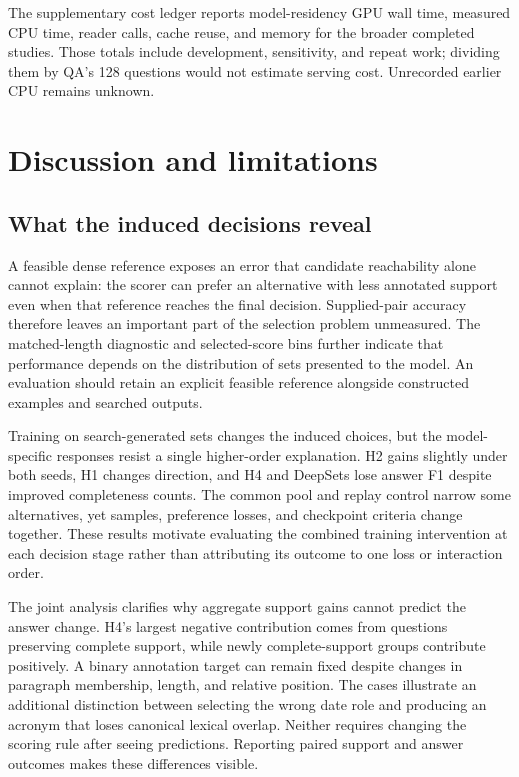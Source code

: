 \documentclass[preprint,12pt]{elsarticle}
\begin{document}


The supplementary cost ledger reports model-residency GPU wall time, measured CPU time, reader calls, cache reuse, and memory for the broader completed studies. Those totals include development, sensitivity, and repeat work; dividing them by QA's 128 questions would not estimate serving cost. Unrecorded earlier CPU remains unknown.

\section{Discussion and limitations}
\subsection{What the induced decisions reveal}
A feasible dense reference exposes an error that candidate reachability alone cannot explain: the scorer can prefer an alternative with less annotated support even when that reference reaches the final decision. Supplied-pair accuracy therefore leaves an important part of the selection problem unmeasured. The matched-length diagnostic and selected-score bins further indicate that performance depends on the distribution of sets presented to the model. An evaluation should retain an explicit feasible reference alongside constructed examples and searched outputs.

Training on search-generated sets changes the induced choices, but the model-specific responses resist a single higher-order explanation. H2 gains slightly under both seeds, H1 changes direction, and H4 and DeepSets lose answer F1 despite improved completeness counts. The common pool and replay control narrow some alternatives, yet samples, preference losses, and checkpoint criteria change together. These results motivate evaluating the combined training intervention at each decision stage rather than attributing its outcome to one loss or interaction order.

The joint analysis clarifies why aggregate support gains cannot predict the answer change. H4's largest negative contribution comes from questions preserving complete support, while newly complete-support groups contribute positively. A binary annotation target can remain fixed despite changes in paragraph membership, length, and relative position. The cases illustrate an additional distinction between selecting the wrong date role and producing an acronym that loses canonical lexical overlap. Neither requires changing the scoring rule after seeing predictions. Reporting paired support and answer outcomes makes these differences visible.
\end{document}
